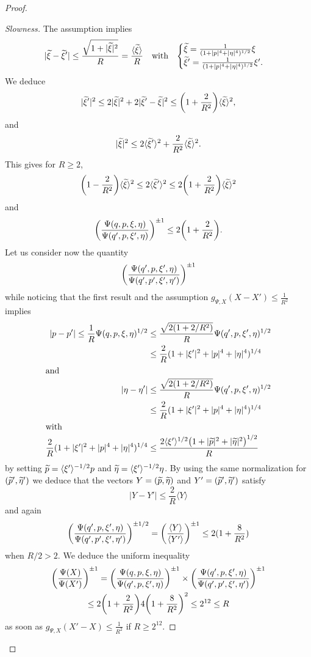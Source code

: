 \documentclass[10pt]{amsart}
\theoremstyle{definition}\newtheorem{defi}[theo]{Definition}\newtheorem{rema}[theo]{Remark}\newtheorem{exam}[theo]{Example}\newtheorem{exem}[theo]{Example}\newtheorem{nota}[theo]{Notation}
\let\oldtilde\tilde
\renewcommand*{\tilde}[1]{\mathchoice{\widetilde{#1}}{\widetilde{#1}}{\oldtilde{#1}}{\oldtilde{#1}}}
\let\originalleft\left
\let\originalright\right
\renewcommand{\left}{\mathopen{}\mathclose\bgroup\originalleft}
\renewcommand{\right}{\aftergroup\egroup\originalright}
\begin{document}
\begin{proof}
\begin{proof}[{Slowness}]
The assumption implies
\[
|\tilde{\xi}-\tilde{\xi}'|\leq \frac{\sqrt{1+|\tilde{\xi}|^{2}}}{R}=\frac{\langle \tilde{\xi}\rangle}{R}\quad\text{with}\quad
\begin{cases}
\tilde{\xi}=\frac{1}{(1+|p|^{4}+|\eta|^{4})^{1/2}}\xi
\\
\tilde{\xi}'=\frac{1}{(1+|p|^{4}+|\eta|^{4})^{1/2}}\xi'.
\end{cases}
\]
We deduce
\[
|\tilde{\xi}'|^{2}\leq 2|\tilde{\xi}|^{2}+2|\tilde{\xi}'-\tilde{\xi}|^{2}\leq \left(1+\frac{2}{R^{2}}\right)\langle \tilde{\xi}\rangle^{2},
\]
and
\[
|\tilde{\xi}|^{2}\leq 2\langle \tilde{\xi}'\rangle^{2}+\frac{2}{R^{2}}\langle \tilde{\xi}\rangle^{2}.
\]
This gives for $R\geq 2$,
\[
\left(1-\frac{2}{R^{2}}\right)\langle \tilde{\xi}\rangle^{2}\leq 2\langle \tilde{\xi}'\rangle^{2}\leq 2\left(1+\frac{2}{R^{2}}\right)\langle \tilde{\xi}\rangle^{2}
\]
and
\[
\left(\frac{\Psi(q,p,\xi,\eta)}{\Psi(q',p,\xi',\eta)}\right)^{\pm 1}\leq 2\left(1+\frac{2}{R^{2}}\right).
\]
Let us consider now the quantity
\[
\left(\frac{\Psi(q',p,\xi',\eta)}{\Psi(q',p',\xi',\eta')}\right)^{\pm 1}
\]
while noticing that the first result and the assumption $g_{\Psi,X}(X-X')\leq \frac{1}{R^{2}}$ implies
\begin{align*}
|p-p'|\leq \frac{1}{R}\Psi(q,p,\xi,\eta)^{1/2}&\leq \frac{\sqrt{2(1+2/R^{2})}}{R}\Psi(q',p,\xi',\eta)^{1/2}\\
&\leq
\frac{2}{R}(1+|\xi'|^{2}+|p|^{4}+|\eta|^{4})^{1/4}\\
\intertext{and}
|\eta-\eta'|&\leq \frac{\sqrt{2(1+2/R^{2})}}{R}\Psi(q',p,\xi',\eta)^{1/2}\\
&\leq
\frac{2}{R}(1+|\xi'|^{2}+|p|^{4}+|\eta|^{4})^{1/4}
\\
\intertext{with}
\frac{2}{R}(1+|\xi'|^{2}+|p|^{4}+|\eta|^{4})^{1/4}&\leq \frac{2\langle \xi'\rangle^{1/2}\left(1+|\tilde{p}|^{2}+|\tilde{\eta}|^{2}\right)^{1/2}}{R}
\end{align*}
by setting $\tilde{p}=\langle \xi'\rangle^{-1/2}p$ and $\tilde{\eta}=\langle \xi'\rangle^{-1/2}\eta$. By using the same normalization for $(\tilde{p}',\tilde{\eta}')$ we deduce that the vectors $Y=(\tilde{p},\tilde{\eta})$ and $Y'=(\tilde{p}',\tilde{\eta}')$ satisfy
\[
|Y-Y'|\leq \frac{2}{R}\langle Y\rangle
\]
and again
\[
\left(\frac{\Psi(q',p,\xi',\eta)}{\Psi(q',p',\xi',\eta')}\right)^{\pm 1/2} =\left(\frac{\langle Y\rangle}{\langle Y'\rangle}\right)^{\pm 1}\leq 2(1+\frac{8}{R^{2}})
\]
when $R/2>2$.
We deduce the uniform inequality
\begin{multline*}
\left(\frac{\Psi(X)}{\Psi(X')}\right)^{\pm 1} =
\left(\frac{\Psi(q,p,\xi,\eta)}{\Psi(q',p,\xi',\eta)}\right)^{\pm 1}\times
\left(\frac{\Psi(q',p,\xi',\eta)}{\Psi(q',p',\xi',\eta')}\right)^{\pm 1}\\
\leq 2\left(1+\frac{2}{R^{2}}\right)4\left(1+\frac{8}{R^{2}}\right)^{2}\leq 2^{12}\leq R
\end{multline*}
as soon as $g_{\Psi,X}(X'-X)\leq \frac{1}{R^{2}}$ if $R\geq 2^{12}$.
\let\qed\relax
\end{proof}


\end{proof}
\end{document}
